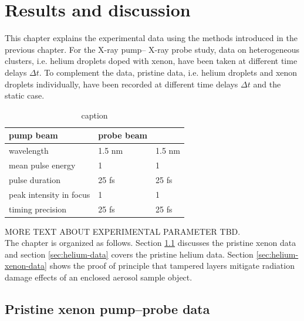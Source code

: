 \chapter{Results and discussion}\label{ch:results}
This chapter explains the experimental data using the methods introduced in the previous chapter. For the X-ray pump-- X-ray probe study, data on heterogeneous clusters, i.e. helium droplets doped with xenon, have been taken at different time delays $\Delta t$. To complement the data, pristine data, i.e. helium droplets and xenon droplets individually, have been recorded at different time delays $\Delta t$ and the static case.\\
\begin{table}
	\centering
		\begin{tabular}{ | l | l | l | }
		\hline
			pump beam & probe beam & \  \\ \hline
			wavelength & 1.5 nm & 1.5 nm \\ \hline
			mean pulse energy & 1 & 1 \\ \hline
			pulse duration & 25 fs & 25 fs \\ \hline
			peak intensity in focus & 1 & 1 \\ \hline
			timing precision & 25 fs & 25 fs \\ \hline
		\end{tabular}
	\caption{caption}
	\label{tab:caption}
\end{table}
MORE TEXT ABOUT EXPERIMENTAL PARAMETER TBD.\\
The chapter is organized as follows. Section \ref{sec:xenon-data} discusses the pristine xenon data and section \ref{sec:helium-data} covers the pristine helium data. Section \ref{sec:helium-xenon-data} shows the proof of principle that tampered layers mitigate radiation damage effects of an enclosed aerosol sample object.
%
%
%
\section{Pristine xenon pump--probe data}\label{sec:xenon-data}
